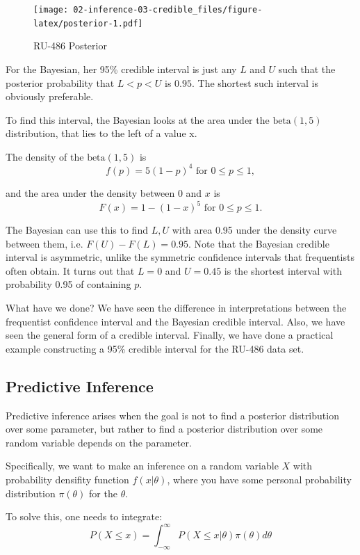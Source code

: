 \documentclass[]{book}
\theoremstyle{definition}
\theoremstyle{definition}
\theoremstyle{definition}
\theoremstyle{remark}
\begin{document}
\begin{figure}
\centering
\texttt{[image: 02-inference-03-credible\_files/figure-latex/posterior-1.pdf]}
\caption{\label{fig:posterior}RU-486 Posterior}
\end{figure}

For the Bayesian, her 95\% credible interval is just any \(L\) and \(U\)
such that the posterior probability that \(L < p < U\) is \(0.95\). The
shortest such interval is obviously preferable.

To find this interval, the Bayesian looks at the area under the
\(\text{beta}(1,5)\) distribution, that lies to the left of a value x.

The density of the \(\text{beta}(1,5)\) is
\[f(p) = 5 (1-p)^4 \text{ for } 0 \leq p \leq 1,\]

and the area under the density between \(0\) and \(x\) is
\[F(x) = 1 - (1-x)^5 \text{ for } 0 \leq p \leq 1.\]

The Bayesian can use this to find \(L, U\) with area 0.95 under the
density curve between them, i.e. \(F(U) − F(L) = 0.95\). Note that the
Bayesian credible interval is asymmetric, unlike the symmetric
confidence intervals that frequentists often obtain. It turns out that
\(L = 0\) and \(U = 0.45\) is the shortest interval with probability
0.95 of containing \(p\).

What have we done? We have seen the difference in interpretations
between the frequentist confidence interval and the Bayesian credible
interval. Also, we have seen the general form of a credible interval.
Finally, we have done a practical example constructing a 95\% credible
interval for the RU-486 data set.

\subsection{Predictive Inference}\label{predictive-inference}

Predictive inference arises when the goal is not to find a posterior
distribution over some parameter, but rather to find a posterior
distribution over some random variable depends on the parameter.

Specifically, we want to make an inference on a random variable \(X\)
with probability densifity function \(f(x|\theta)\), where you have some
personal probability distribution \(\pi(\theta)\) for the \(\theta\).

To solve this, one needs to integrate:
\[P(X \leq x) = \int^{\infty}_{-\infty} P(X \leq x | \theta)\pi(\theta)d\theta\]
\end{document}
